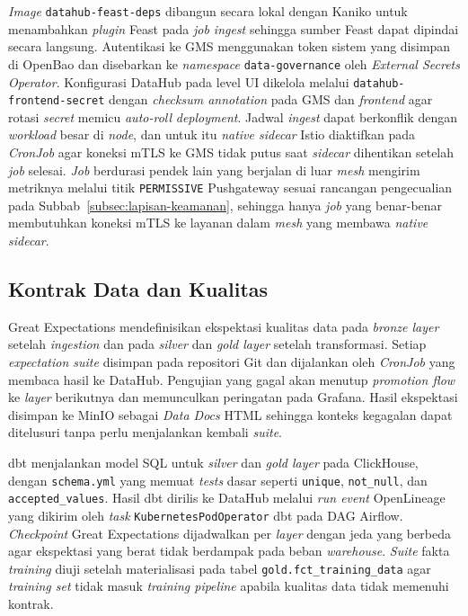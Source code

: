 \textit{Image} \texttt{datahub-feast-deps} dibangun secara lokal dengan Kaniko untuk menambahkan \textit{plugin} Feast pada \textit{job ingest} sehingga sumber Feast dapat dipindai secara langsung. Autentikasi ke GMS menggunakan token sistem yang disimpan di OpenBao dan disebarkan ke \textit{namespace} \texttt{data-governance} oleh \textit{External Secrets Operator}. Konfigurasi DataHub pada level UI dikelola melalui \texttt{datahub-frontend-secret} dengan \textit{checksum annotation} pada GMS dan \textit{frontend} agar rotasi \textit{secret} memicu \textit{auto-roll} \textit{deployment}. Jadwal \textit{ingest} dapat berkonflik dengan \textit{workload} besar di \textit{node}, dan untuk itu \textit{native sidecar} Istio diaktifkan pada \textit{CronJob} agar koneksi mTLS ke GMS tidak putus saat \textit{sidecar} dihentikan setelah \textit{job} selesai. \textit{Job} berdurasi pendek lain yang berjalan di luar \textit{mesh} mengirim metriknya melalui titik \texttt{PERMISSIVE} Pushgateway sesuai rancangan pengecualian pada Subbab~\ref{subsec:lapisan-keamanan}, sehingga hanya \textit{job} yang benar-benar membutuhkan koneksi mTLS ke layanan dalam \textit{mesh} yang membawa \textit{native sidecar}.

\subsection{Kontrak Data dan Kualitas}
\label{subsec:impl-kualitas}

Great Expectations \autocite{greatexpectations2024} mendefinisikan ekspektasi kualitas data pada \textit{bronze layer} setelah \textit{ingestion} dan pada \textit{silver} dan \textit{gold layer} setelah transformasi. Setiap \textit{expectation suite} disimpan pada repositori Git dan dijalankan oleh \textit{CronJob} yang membaca hasil ke DataHub. Pengujian yang gagal akan menutup \textit{promotion flow} ke \textit{layer} berikutnya dan memunculkan peringatan pada Grafana. Hasil ekspektasi disimpan ke MinIO sebagai \textit{Data Docs} HTML sehingga konteks kegagalan dapat ditelusuri tanpa perlu menjalankan kembali \textit{suite}.

dbt menjalankan model SQL untuk \textit{silver} dan \textit{gold layer} pada ClickHouse, dengan \texttt{schema.yml} yang memuat \textit{tests} dasar seperti \texttt{unique}, \texttt{not\_null}, dan \texttt{accepted\_values}. Hasil dbt dirilis ke DataHub melalui \textit{run event} OpenLineage yang dikirim oleh \textit{task} \texttt{KubernetesPodOperator} dbt pada DAG Airflow. \textit{Checkpoint} Great Expectations dijadwalkan per \textit{layer} dengan jeda yang berbeda agar ekspektasi yang berat tidak berdampak pada beban \textit{warehouse}. \textit{Suite} fakta \textit{training} diuji setelah materialisasi pada tabel \texttt{gold.fct\_training\_data} agar \textit{training set} tidak masuk \textit{training pipeline} apabila kualitas data tidak memenuhi kontrak.

